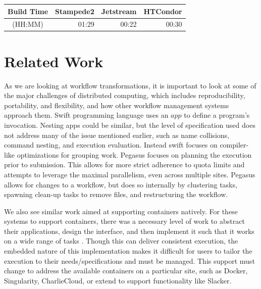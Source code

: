 \documentclass[conference]{IEEEtran}
\begin{document}
\begin{center}
\begin{tabular}{| c | r | r | r |}
\hline
Build Time
  & \multicolumn{1}{|c|}{Stampede2} 
  & \multicolumn{1}{|c|}{Jetstream} 
  & \multicolumn{1}{|c|}{HTCondor} \\ \hline
 (HH:MM) & 01:29 & 00:22 & 00:30 \\ \hline
\end{tabular}
\end{center}

\section{Related Work}

As we are looking at workflow 
transformations, it is important to look
at some of the major challenges of distributed
computing\cite{4404805},
which includes reproducibility, 
portability,
and flexibility, and 
how other workflow management systems
approach them.
Swift\cite{swift} programming language 
uses an $app$ to define a program's invocation.
Nesting apps could be similar, 
but the level of
specification used does
not address many of the
issue mentioned earlier, such
as name collisions, command
nesting, and execution evaluation.
Instead swift focuses on compiler-like
optimizations for grouping work\cite{Armstrong:2014:CTM:2683593.2683627}.
Pegasus\cite{pegasus} focuses on planning the
execution prior to submission.
This allows for more strict
adherence to quota limits and attempts
to leverage the maximal parallelism,
even across multiple sites\cite{chen2011constraints}.
Pegasus allows for changes to a
workflow, but does so internally by clustering
tasks\cite{chen2013balanced, chen-tcc-2015, chen-fgcs-2014}, spawning clean-up
tasks to remove files\cite{cleanup_algo}, and 
restructuring the workflow\cite{cluster_dep}.

We also see similar work aimed at 
supporting containers natively.
For these systems to support containers,
there was a necessary level of work to abstract their applications,
design the interface, and then implement it
such that it works on a wide range of tasks
\cite{wq-docker-vtdc15, containers-sciencecloud-2018,7092947,7600178}.
Though this can deliver consistent execution,
the embedded nature of this implementation makes
it difficult for users to tailor the execution
to their needs/specifications and must be
managed.
This support must change to address
the available containers on a particular site,
such as 
Docker\cite{Merkel:2014:DLL:2600239.2600241},
Singularity\cite{Singularity}, 
CharlieCloud\cite{Priedhorsky:2017:CUC:3126908.3126925},
or extend to support functionality like Slacker\cite{194430}.
\end{document}
